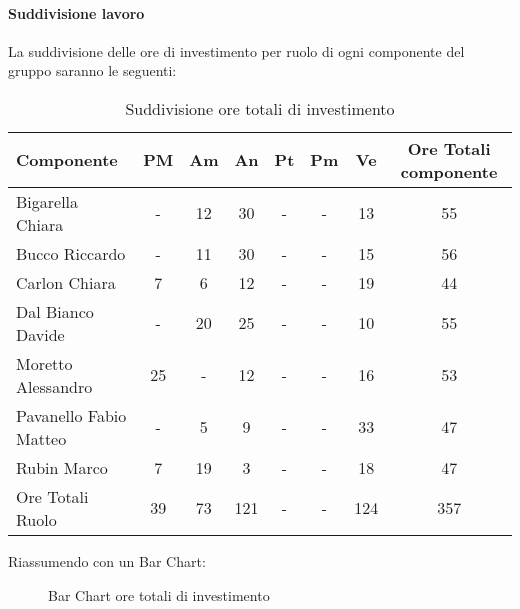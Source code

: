 			\paragraph{Suddivisione lavoro}
				La suddivisione delle ore di investimento per ruolo di ogni componente del gruppo \groupname{} saranno le seguenti:
				\begin{table}
					\begin{center}
						\begin{tabular}{| l | c | c | c | c | c | c | c |}
							\hline
							Componente 					& PM		& Am 		& An 		& Pt 		& Pm 		& Ve 		& Ore Totali componente \\ \hline
							
							Bigarella Chiara 			& - 		& 12 		& 30 		& - 		& - 		& 13 		& 55 \\
							Bucco Riccardo 				& - 		& 11 		& 30 		& - 		& -			& 15 		& 56 \\
							Carlon Chiara	 			& 7 		& 6 		& 12 		& - 		& - 		& 19 		& 44 \\
							Dal Bianco Davide 			& - 		& 20 		& 25 		& - 		& - 		& 10 		& 55 \\
							Moretto Alessandro 			& 25 		& - 		& 12 		& - 		& - 		& 16 		& 53 \\
							Pavanello Fabio Matteo	 	& - 		& 5 		& 9 		& - 		& - 		& 33 		& 47 \\
							Rubin Marco					& 7 		& 19 		& 3 		& - 		& - 		& 18 		& 47 \\ \hline \hline
							
							Ore Totali Ruolo 			& 39 		& 73 		& 121 		& - 		& - 		& 124 		& 357\\ \hline
						\end{tabular}
					\end{center}
					\caption{Suddivisione ore totali di investimento}
				\end{table}
				Riassumendo con un Bar Chart:
				\begin{figure}\centering
					\caption{Bar Chart ore totali di investimento}
				\end{figure}

